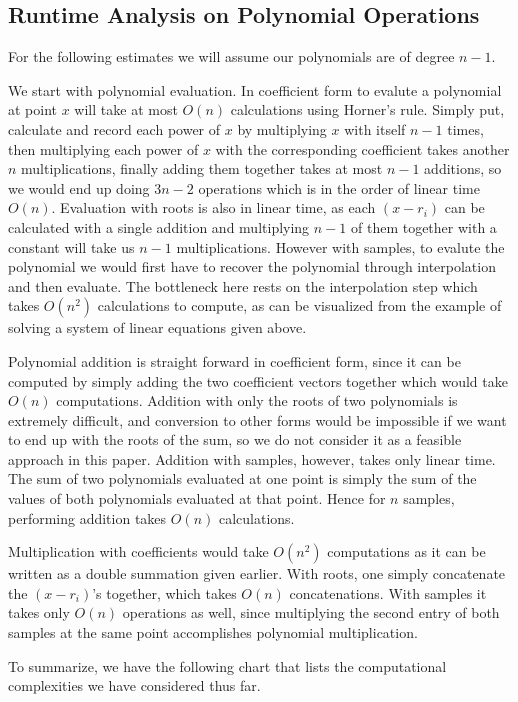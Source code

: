 \documentclass[../article.tex]{subfiles}
\begin{document}
\subsection{Runtime Analysis on Polynomial Operations}

For the following estimates we will assume our polynomials are of degree $n-1$.

We start with polynomial evaluation. In coefficient form to evalute a polynomial at point $x$ will take at most $O(n)$ calculations using Horner's rule. Simply put, calculate and record each power of $x$ by multiplying $x$ with itself $n-1$ times, then multiplying each power of $x$ with the corresponding coefficient takes another $n$ multiplications, finally adding them together takes at most $n-1$ additions, so we would end up doing $3n-2$ operations which is in the order of linear time $O(n)$. Evaluation with roots is also in linear time, as each $(x-r_i)$ can be calculated with a single addition and multiplying $n-1$ of them together with a constant will take us $n-1$ multiplications. However with samples, to evalute the polynomial we would first have to recover the polynomial through interpolation and then evaluate. The bottleneck here rests on the interpolation step which takes $O(n^2)$ calculations to compute, as can be visualized from the example of solving a system of linear equations given above.

Polynomial addition is straight forward in coefficient form, since it can be computed by simply adding the two coefficient vectors together which would take $O(n)$ computations. Addition with only the roots of two polynomials is extremely difficult, and conversion to other forms would be impossible if we want to end up with the roots of the sum, so we do not consider it as a feasible approach in this paper. Addition with samples, however, takes only linear time. The sum of two polynomials evaluated at one point is simply the sum of the values of both polynomials evaluated at that point. Hence for $n$ samples, performing addition takes $O(n)$ calculations.

Multiplication with coefficients would take $O(n^2)$ computations as it can be written as a double summation given earlier. With roots, one simply concatenate the $(x-r_i)$'s together, which takes $O(n)$ concatenations. With samples it takes only $O(n)$ operations as well, since multiplying the second entry of both samples at the same point accomplishes polynomial multiplication.

To summarize, we have the following chart that lists the computational complexities we have considered thus far.
\end{document}
